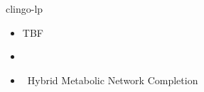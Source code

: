 \begin{frame}{clingo-lp}
  \begin{itemize}
  \item <1-> TBF
  \item {} \ \cite{jakaosscscwa17a,karoscwa21a}
  \item {} \ Hybrid Metabolic Network Completion~\cite{frscscsiwa18a}
  \end{itemize}
\end{frame}
%
